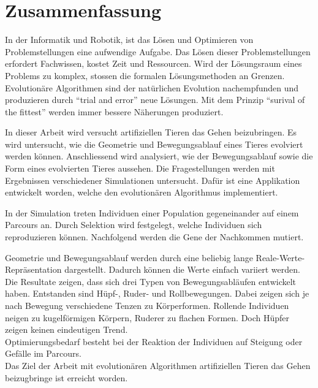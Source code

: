 %
%


\chapter{Zusammenfassung}

  In der Informatik und Robotik, ist das Lösen und Optimieren von Problemstellungen eine aufwendige Aufgabe.
  Das Lösen dieser Problemstellungen erfordert Fachwissen, kostet Zeit und Ressourcen.
  Wird der Lösungsraum eines Problems zu komplex, stossen die formalen Lösungsmethoden an Grenzen.
  Evolutionäre Algorithmen sind der natürlichen Evolution nachempfunden und
  produzieren durch ``trial and error'' neue Lösungen.
  Mit dem Prinzip ``surival of the fittest'' werden immer bessere Näherungen produziert.

  \smallskip

  In dieser Arbeit wird versucht artifiziellen Tieren das Gehen beizubringen.
  Es wird untersucht, wie die Geometrie und Bewegungsablauf eines Tieres evolviert werden können.
  Anschliessend wird analysiert, wie der Bewegungsablauf sowie die Form eines evolvierten Tieres aussehen.
  Die Fragestellungen werden mit Ergebnissen verschiedener Simulationen untersucht.
  Dafür ist eine Applikation entwickelt worden, welche den evolutionären Algorithmus implementiert.

  \smallskip

  In der Simulation treten Individuen einer Population gegeneinander auf einem Parcours an.
  Durch Selektion wird festgelegt, welche Individuen sich reproduzieren können.
  Nachfolgend werden die Gene der Nachkommen mutiert.

  \smallskip

  Geometrie und Bewegungsablauf werden durch eine beliebig lange Reale-Werte-Repräsentation dargestellt.
  Dadurch können die Werte einfach variiert werden.
  Die Resultate zeigen, dass sich drei Typen von Bewegungsabläufen entwickelt haben.
  Entstanden sind Hüpf-, Ruder- und Rollbewegungen.
  Dabei zeigen sich je nach Bewegung verschiedene Tenzen zu Körperformen.
  Rollende Individuen neigen zu kugelförmigen Körpern, Ruderer zu flachen Formen.
  Doch Hüpfer zeigen keinen eindeutigen Trend.
  \\
  Optimierungsbedarf besteht bei der Reaktion der Individuen auf Steigung oder Gefälle im Parcours.
  \\
  Das Ziel der Arbeit mit evolutionären Algorithmen artifiziellen Tieren das Gehen beizugbringe ist erreicht worden.
